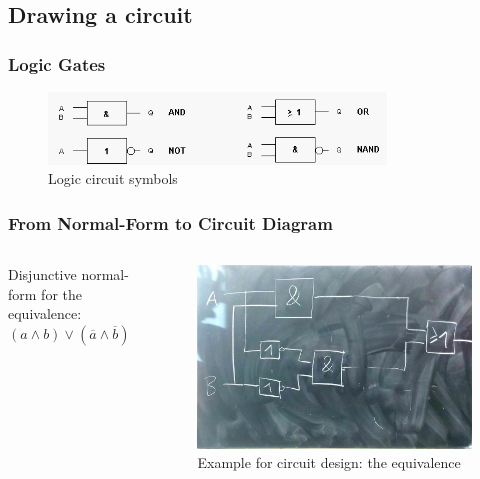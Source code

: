\documentclass{beamer}
\begin{document}
\subsection{Drawing a circuit}

\begin{frame}\frametitle{Logic Gates}
  \begin{figure}[H]
\centering
  \includegraphics[width=0.8\textwidth]{gatter}%
  \caption{Logic circuit symbols}%
  \label{fig:logic_symbols}
\end{figure}
\end{frame}


\begin{frame}\frametitle{From Normal-Form to Circuit Diagram}
  \begin{columns}
  \begin{column}{5cm}
  Disjunctive normal-form for the equivalence: 
  \newline\newline
  $(a\land b)\lor(\overline{a}\land \overline{b})$
  \end{column}
  
  \begin{column}{6cm}
    \begin{figure}[H]
      \centering
      \includegraphics[width=1\textwidth]{eq1}%
      \caption{Example for circuit design: the equivalence}%
      \label{fig:equivalence}
    \end{figure}
  \end{column}
  \end{columns}  
\end{frame}
\end{document}
